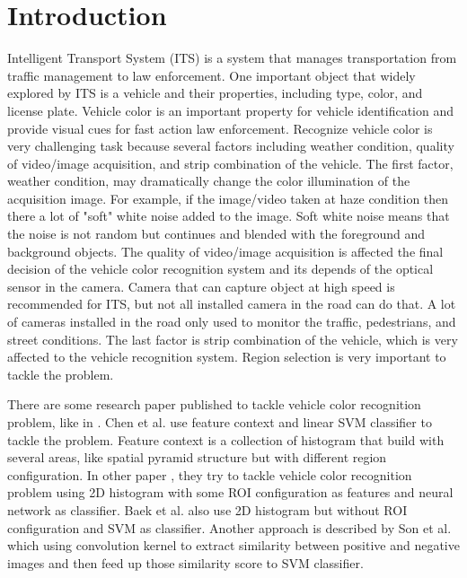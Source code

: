 \documentclass[conference]{IEEEtran}
\begin{document}




%
\IEEEpeerreviewmaketitle



\section{Introduction}

Intelligent Transport System (ITS) is a system that manages transportation from traffic management to law enforcement. One important object that widely explored by ITS is a vehicle and their properties, including type, color, and license plate. Vehicle color is an important property for vehicle identification and provide visual cues for fast action law enforcement. Recognize vehicle color is very challenging task because several factors including weather condition, quality of video/image acquisition, and strip combination of the vehicle. The first factor, weather condition, may dramatically change the color illumination of the acquisition image. For example, if the image/video taken at haze condition then there a lot of "soft" white noise added to the image. Soft white noise means that the noise is not random but continues and blended with the foreground and background objects. The quality of video/image acquisition is affected the final decision of the vehicle color recognition system and its depends of the optical sensor in the camera. Camera that can capture object at high speed is recommended for ITS, but not all installed camera in the road can do that. A lot of cameras installed in the road only used to monitor the traffic, pedestrians, and street conditions. The last factor is strip combination of the vehicle, which is very affected to the vehicle recognition system. Region selection is very important to tackle the problem.

There are some research paper published to tackle vehicle color recognition problem, like in \cite{hsieh,pchen,dule,baek,jwson}. Chen et al. \cite{pchen} use feature context and linear SVM classifier to tackle the problem. Feature context is a collection of histogram that build with several areas, like spatial pyramid structure but with different region configuration. In other paper \cite{dule}, they try to tackle vehicle color recognition problem using 2D histogram with some ROI configuration as features and neural network as classifier. Baek et al. \cite{baek} also use 2D histogram but without ROI configuration and SVM as classifier. Another approach is described by Son et al. \cite{jwson} which using convolution kernel to extract similarity between positive and negative images and then feed up those similarity score to SVM classifier.
\end{document}
